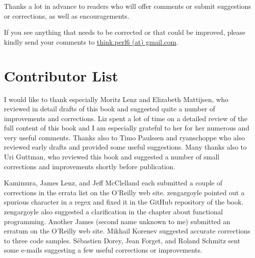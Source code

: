 Thanks a lot in advance to readers who will offer comments 
or submit suggestions or corrections, as well as encouragements.

If you see anything that needs to be corrected or that 
could be improved, please kindly send your comments to 
\url{think.perl6 (at) gmail.com}.


\section*{Contributor List}

I would like to thank especially Moritz Lenz and Elizabeth 
Mattijsen, who reviewed in detail drafts of this book 
and suggested quite a number of improvements and corrections. Liz 
spent a lot of time on a detailed review of the full 
content of this book and I am especially grateful to her for 
her numerous and very useful comments. Thanks also to Timo Paulssen and 
ryanschoppe who also reviewed early drafts and provided some  
useful suggestions. Many thanks also to Uri Guttman, who reviewed 
this book and suggested a number of small corrections and improvements 
shortly before publication. 

Kamimura, James Lenz, and Jeff McClelland each submitted a couple 
of corrections in the errata list on the O'Reilly web site.
zengargoyle pointed out a spurious character in a regex 
and fixed it in the GitHub repository of the book. zengargoyle
also suggested a clarification in the chapter about functional 
programming. Another James (second name unknown to me) 
submitted an erratum on the O'Reilly web site. Mikhail Korenev 
suggested accurate corrections to three code samples.  
Sébastien Dorey, Jean Forget, and Roland Schmitz sent some e-mails 
suggesting a few useful corrections or improvements.

\clearemptydoublepage

\begin{latexonly}

\tableofcontents

\clearemptydoublepage

\end{latexonly}

